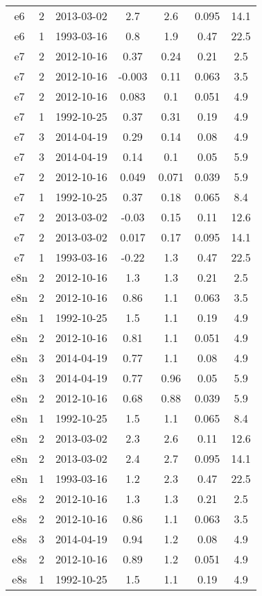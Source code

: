 \begin{longtable}[htp]
\begin{longtable}{ccccccc}
e6 & 2 & 2013-03-02 & 2.7 & 2.6 & 0.095 & 14.1 \\
e6 & 1 & 1993-03-16 & 0.8 & 1.9 & 0.47 & 22.5 \\
e7 & 2 & 2012-10-16 & 0.37 & 0.24 & 0.21 & 2.5 \\
e7 & 2 & 2012-10-16 & -0.003 & 0.11 & 0.063 & 3.5 \\
e7 & 2 & 2012-10-16 & 0.083 & 0.1 & 0.051 & 4.9 \\
e7 & 1 & 1992-10-25 & 0.37 & 0.31 & 0.19 & 4.9 \\
e7 & 3 & 2014-04-19 & 0.29 & 0.14 & 0.08 & 4.9 \\
e7 & 3 & 2014-04-19 & 0.14 & 0.1 & 0.05 & 5.9 \\
e7 & 2 & 2012-10-16 & 0.049 & 0.071 & 0.039 & 5.9 \\
e7 & 1 & 1992-10-25 & 0.37 & 0.18 & 0.065 & 8.4 \\
e7 & 2 & 2013-03-02 & -0.03 & 0.15 & 0.11 & 12.6 \\
e7 & 2 & 2013-03-02 & 0.017 & 0.17 & 0.095 & 14.1 \\
e7 & 1 & 1993-03-16 & -0.22 & 1.3 & 0.47 & 22.5 \\
e8n & 2 & 2012-10-16 & 1.3 & 1.3 & 0.21 & 2.5 \\
e8n & 2 & 2012-10-16 & 0.86 & 1.1 & 0.063 & 3.5 \\
e8n & 1 & 1992-10-25 & 1.5 & 1.1 & 0.19 & 4.9 \\
e8n & 2 & 2012-10-16 & 0.81 & 1.1 & 0.051 & 4.9 \\
e8n & 3 & 2014-04-19 & 0.77 & 1.1 & 0.08 & 4.9 \\
e8n & 3 & 2014-04-19 & 0.77 & 0.96 & 0.05 & 5.9 \\
e8n & 2 & 2012-10-16 & 0.68 & 0.88 & 0.039 & 5.9 \\
e8n & 1 & 1992-10-25 & 1.5 & 1.1 & 0.065 & 8.4 \\
e8n & 2 & 2013-03-02 & 2.3 & 2.6 & 0.11 & 12.6 \\
e8n & 2 & 2013-03-02 & 2.4 & 2.7 & 0.095 & 14.1 \\
e8n & 1 & 1993-03-16 & 1.2 & 2.3 & 0.47 & 22.5 \\
e8s & 2 & 2012-10-16 & 1.3 & 1.3 & 0.21 & 2.5 \\
e8s & 2 & 2012-10-16 & 0.86 & 1.1 & 0.063 & 3.5 \\
e8s & 3 & 2014-04-19 & 0.94 & 1.2 & 0.08 & 4.9 \\
e8s & 2 & 2012-10-16 & 0.89 & 1.2 & 0.051 & 4.9 \\
e8s & 1 & 1992-10-25 & 1.5 & 1.1 & 0.19 & 4.9 \\

\end{longtable}
\end{longtable}
